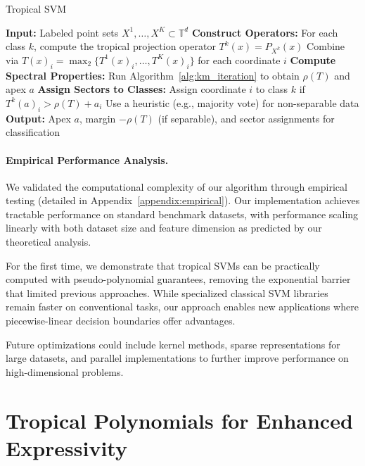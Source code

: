 \documentclass{article}
\newcommand{\trop}{\mathbb{T}}
\begin{document}
\begin{algorithm}
\caption{Tropical SVM}\label{alg:tropical_svm}
\begin{algorithmic}[1]
\STATE \textbf{Input:} Labeled point sets $X^1,\dots,X^K \subset \trop^d$
\STATE \textbf{Construct Operators:}
  \STATE \quad For each class $k$, compute the tropical projection operator $T^k(x) = P_{X^k}(x)$
  \STATE \quad Combine via $T(x)_i = \operatorname{\max}_2\{T^1(x)_i, \dots, T^K(x)_i\}$ for each coordinate $i$
\STATE \textbf{Compute Spectral Properties:}
  \STATE \quad Run Algorithm~\ref{alg:km_iteration} to obtain $\rho(T)$ and apex $a$
\STATE \textbf{Assign Sectors to Classes:}
    \STATE Assign coordinate $i$ to class $k$ if $T^k(a)_i > \rho(T) + a_i$ 
  \ELSE
    \STATE Use a heuristic (e.g., majority vote) for non-separable data 
  \ENDIF
\STATE \textbf{Output:} Apex $a$, margin $-\rho(T)$ (if separable), and sector assignments for classification
\end{algorithmic}
\end{algorithm}

\paragraph{Empirical Performance Analysis.}
We validated the computational complexity of our algorithm through empirical testing (detailed in Appendix~\ref{appendix:empirical}). Our implementation achieves tractable performance on standard benchmark datasets, with performance scaling linearly with both dataset size and feature dimension as predicted by our theoretical analysis.

For the first time, we demonstrate that tropical SVMs can be practically computed with pseudo-polynomial guarantees, removing the exponential barrier that limited previous approaches. While specialized classical SVM libraries remain faster on conventional tasks, our approach enables new applications where piecewise-linear decision boundaries offer advantages.

Future optimizations could include kernel methods, sparse representations for large datasets, and parallel implementations to further improve performance on high-dimensional problems.

\section{Tropical Polynomials for Enhanced Expressivity}\label{sec:polynomials}
\end{document}
